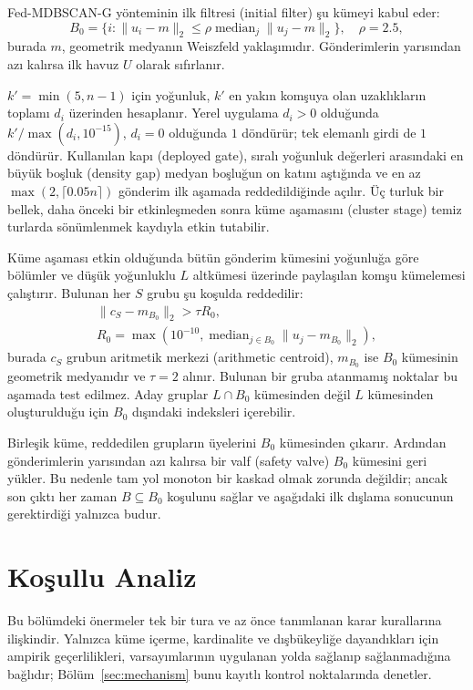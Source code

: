 \documentclass[journal]{IEEEtran}
\newcommand{\method}{Fed-MDBSCAN-G}
\begin{document}
\method{} yönteminin ilk filtresi (initial filter) şu kümeyi kabul eder:
\begin{equation}
B_0=\{i:\|u_i-m\|_2\leq\rho\operatorname{median}_j\|u_j-m\|_2\},\quad\rho=2.5,
\label{eq:l0}
\end{equation}
burada $m$, geometrik medyanın Weiszfeld yaklaşımıdır. Gönderimlerin yarısından azı kalırsa ilk havuz $U$ olarak sıfırlanır.

$k'=\min(5,n-1)$ için yoğunluk, $k'$ en yakın komşuya olan uzaklıkların toplamı $d_i$ üzerinden hesaplanır. Yerel uygulama $d_i>0$ olduğunda $k'/\max(d_i,10^{-15})$, $d_i=0$ olduğunda $1$ döndürür; tek elemanlı girdi de $1$ döndürür. Kullanılan kapı (deployed gate), sıralı yoğunluk değerleri arasındaki en büyük boşluk (density gap) medyan boşluğun on katını aştığında ve en az $\max(2,\lceil0.05n\rceil)$ gönderim ilk aşamada reddedildiğinde açılır. Üç turluk bir bellek, daha önceki bir etkinleşmeden sonra küme aşamasını (cluster stage) temiz turlarda sönümlenmek kaydıyla etkin tutabilir.

Küme aşaması etkin olduğunda bütün gönderim kümesini yoğunluğa göre bölümler ve düşük yoğunluklu $L$ altkümesi üzerinde paylaşılan komşu kümelemesi çalıştırır. Bulunan her $S$ grubu şu koşulda reddedilir:
\begin{equation}
\begin{gathered}
\|c_S-m_{B_0}\|_2>\tau R_0,\\
R_0=\max\!\left(10^{-10},\operatorname{median}_{j\in B_0}\|u_j-m_{B_0}\|_2\right),
\end{gathered}
\label{eq:consensus}
\end{equation}
burada $c_S$ grubun aritmetik merkezi (arithmetic centroid), $m_{B_0}$ ise $B_0$ kümesinin geometrik medyanıdır ve $\tau=2$ alınır. Bulunan bir gruba atanmamış noktalar bu aşamada test edilmez. Aday gruplar $L\cap B_0$ kümesinden değil $L$ kümesinden oluşturulduğu için $B_0$ dışındaki indeksleri içerebilir.

Birleşik küme, reddedilen grupların üyelerini $B_0$ kümesinden çıkarır. Ardından gönderimlerin yarısından azı kalırsa bir valf (safety valve) $B_0$ kümesini geri yükler. Bu nedenle tam yol monoton bir kaskad olmak zorunda değildir; ancak son çıktı her zaman $B\subseteq B_0$ koşulunu sağlar ve aşağıdaki ilk dışlama sonucunun gerektirdiği yalnızca budur.

\section{Koşullu Analiz}\label{sec:theory}
Bu bölümdeki önermeler tek bir tura ve az önce tanımlanan karar kurallarına ilişkindir. Yalnızca küme içerme, kardinalite ve dışbükeyliğe dayandıkları için ampirik geçerlilikleri, varsayımlarının uygulanan yolda sağlanıp sağlanmadığına bağlıdır; Bölüm~\ref{sec:mechanism} bunu kayıtlı kontrol noktalarında denetler.
\end{document}
